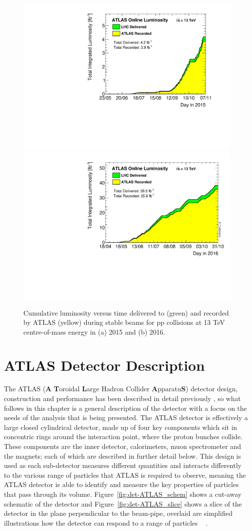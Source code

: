 \begin{figure}[!ht]
  \begin{center}
    \includegraphics[width=0.45\linewidth, angle=0]{figs/Detector/lumi_2015.pdf}
    \includegraphics[width=0.45\linewidth, angle=0]{figs/Detector/lumi_2016.pdf}
  \end{center}
  \caption{Cumulative luminosity versus time delivered to (green) and recorded by ATLAS (yellow) during stable beams for pp collisions at 13 TeV centre-of-mass energy in (a) 2015 and (b) 2016.}
  \label{fig:det-lumi_2015_2016}
\end{figure}

\section{ATLAS Detector Description}
\label{sec:det-ATLAS}

The ATLAS (\textbf{A} \textbf{T}oroidal \textbf{L}arge Hadron Collider \textbf{A}pparatu\textbf{S}) detector
design, construction and performance has been described in detail previously
\cite{det-ATLAS_Exp, det-ATLAS_TDR, det-ATLAS_Perf},
so what follows in this chapter is a general description of the detector with a focus on the
needs of the analysis that is being presented.
The ATLAS detector is effectively a large closed cylindrical detector,
made up of four key components which sit in concentric rings around the interaction point, where the proton bunches collide.
These components are the inner detector, calorimeters, muon spectrometer and the magnets; each of which are described in further detail below.
This design is used as each sub-detector measures different quantities and interacts differently to the various range of particles that ATLAS is required to observe,
meaning the ATLAS detector is able to identify and measure the key properties of particles that pass through its volume.
Figure~\ref{fig:det-ATLAS_schem} shows a cut-away schematic of the detector
and Figure~\ref{fig:det-ATLAS_slice} shows a slice of the detector in the plane perpendicular to the beam-pipe,
overlaid are simplified illustrations how the detector can respond to a range of particles ~\cite{det-thesis_gutchow} .
\\

